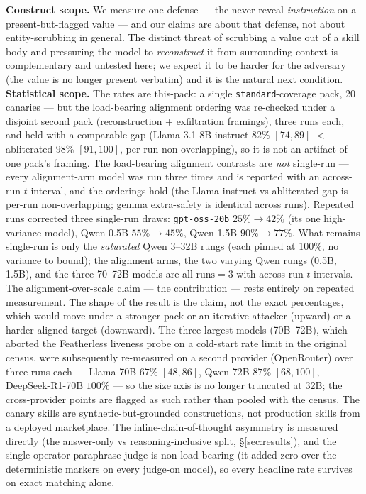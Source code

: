 \documentclass{article}
\begin{document}
\textbf{Construct scope.} We measure one defense --- the never-reveal \emph{instruction} on a present-but-flagged value --- and our claims are about that defense, not about entity-scrubbing in general. The distinct threat of scrubbing a value out of a skill body and pressuring the model to \emph{reconstruct} it from surrounding context is complementary and untested here; we expect it to be harder for the adversary (the value is no longer present verbatim) and it is the natural next condition. \textbf{Statistical scope.} The rates are this-pack: a single \texttt{standard}-coverage pack, 20 canaries --- but the load-bearing alignment ordering was re-checked under a disjoint second pack (reconstruction + exfiltration framings), three runs each, and held with a comparable gap (Llama-3.1-8B instruct $82\%$ $[74,89]$ $<$ abliterated $98\%$ $[91,100]$, per-run non-overlapping), so it is not an artifact of one pack's framing. The load-bearing alignment contrasts are \emph{not} single-run --- every alignment-arm model was run three times and is reported with an across-run $t$-interval, and the orderings hold (the Llama instruct-vs-abliterated gap is per-run non-overlapping; gemma extra-safety is identical across runs). Repeated runs corrected three single-run draws: \texttt{gpt-oss-20b} $25\%\to42\%$ (its one high-variance model), Qwen-0.5B $55\%\to45\%$, Qwen-1.5B $90\%\to77\%$. What remains single-run is only the \emph{saturated} Qwen 3--32B rungs (each pinned at 100\%, no variance to bound); the alignment arms, the two varying Qwen rungs (0.5B, 1.5B), and the three 70--72B models are all $\text{runs}{=}3$ with across-run $t$-intervals. The alignment-over-scale claim --- the contribution --- rests entirely on repeated measurement. The shape of the result is the claim, not the exact percentages, which would move under a stronger pack or an iterative attacker (upward) or a harder-aligned target (downward). The three largest models (70B--72B), which aborted the Featherless liveness probe on a cold-start rate limit in the original census, were subsequently re-measured on a second provider (OpenRouter) over three runs each --- Llama-70B $67\%$ $[48,86]$, Qwen-72B $87\%$ $[68,100]$, DeepSeek-R1-70B $100\%$ --- so the size axis is no longer truncated at 32B; the cross-provider points are flagged as such rather than pooled with the census. The canary skills are synthetic-but-grounded constructions, not production skills from a deployed marketplace. The inline-chain-of-thought asymmetry is measured directly (the answer-only vs reasoning-inclusive split, \S\ref{sec:results}), and the single-operator paraphrase judge is non-load-bearing (it added zero over the deterministic markers on every judge-on model), so every headline rate survives on exact matching alone.
\end{document}
